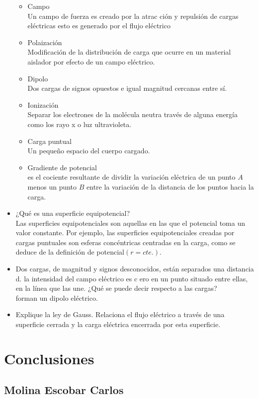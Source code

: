 \documentclass[11pt]{article}
\begin{document}
\begin{multicols}{2}
\begin{itemize}
\begin{itemize}
		\item Campo\\
Un campo de fuerza es creado por la atrac
ción y repulsión de cargas
eléctricas esto es generado por el flujo eléctrico
		\item Polaización\\
Modificación de la distribución de
 carga que ocurre en un material
aislador por efecto de un campo eléctrico.
		\item Dipolo\\
Dos cargas de signos opuestos e igual magnitud cercanas entre sí.
		\item Ionización\\
Separar los electrones de la molécula neutra través de alguna
energía como los rayo x o luz  ultravioleta.
		\item Carga puntual\\
Un pequeño espacio del cuerpo 
cargado.
		\item Gradiente de potencial\\
es el cociente resultante de dividir la variación eléctrica de
un punto $A$ menos un punto $B$ entre la variación de la distancia de los puntos hacia
la carga.
		\end{itemize}
		\item ¿Qué es una superficie equipotencial?\\
		Las superficies equipotenciales son aquellas en las
		 que el potencial toma un valor
		constante. Por ejemplo, las superficies equipotenciales creadas por cargas
		puntuales son esferas concéntricas centradas en la 
		carga, como se deduce de la
			definición de potencial$(r = cte.)$.
		\item Dos cargas, de magnitud y signos desconocidos,
 están separados una
distancia d. la intensidad del campo eléctrico es c
ero en un punto situado entre
ellas, en la línea que las une. ¿Qué se puede decir
 respecto a las cargas?\\
forman un dipolo eléctrico.
		\item Explique la ley de Gauss.
Relaciona el flujo eléctrico a través de una superficie cerrada y la
carga eléctrica encerrada por esta superficie.
\end{itemize}

\section{Conclusiones}

\subsection{Molina Escobar Carlos}


\end{multicols}
\end{document}
